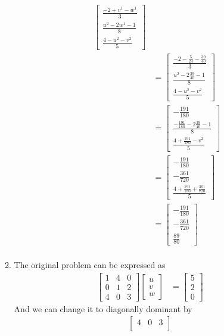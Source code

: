 \documentclass{article}
\begin{document}
\begin{enumerate}
\begin{enumerate}
\begin{itemize}
\begin{align*}
\begin{bmatrix}
\frac{-2+v^1-w^1}{3}\\
\frac{u^2-2w^1-1}{8}\\
\frac{4-u^2-v^2}{5}
\end{bmatrix}\\
&= \begin{bmatrix}
\frac{-2-\frac{5}{24}-\frac{39}{40}}{3}\\
\frac{u^2-2\frac{39}{40}-1}{8}\\
\frac{4-u^2-v^2}{5}
\end{bmatrix}\\
&= \begin{bmatrix}
-\frac{191}{180}\\ 	
\frac{-\frac{191}{180}-2\frac{39}{40}-1}{8}\\
\frac{4+\frac{191}{180}-v^2}{5}
\end{bmatrix}\\
&= \begin{bmatrix}
-\frac{191}{180}\\
-\frac{361}{720}\\
\frac{4+\frac{191}{180}+\frac{361}{720}}{5}
\end{bmatrix}\\
&= \begin{bmatrix}
-\frac{191}{180}\\
-\frac{361}{720}\\
\frac{89}{80}
\end{bmatrix}\\
\end{align*}
\end{itemize}
\item
The original problem can be expressed as \begin{align*}
\begin{bmatrix}
1&4&0\\
0&1&2\\
4&0&3
\end{bmatrix}\begin{bmatrix}
u\\v\\w
\end{bmatrix}&=\begin{bmatrix}
5\\2\\0
\end{bmatrix}
\end{align*}
And we can change it to diagonally dominant by\begin{align*}
\begin{bmatrix}
4&0&3\\

\end{bmatrix}
\end{align*}
\end{enumerate}
\end{enumerate}
\end{document}
